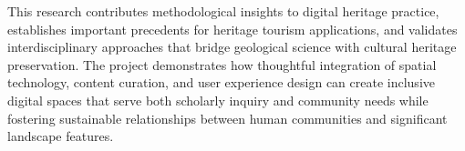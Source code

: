 \documentclass[
11pt, %
english, %
singlespacing, %
headsepline, %
]{MastersDoctoralThesis} %
\begin{document}
\begin{execSummary}
This research contributes methodological insights to digital heritage practice, establishes important precedents for heritage tourism applications, and validates interdisciplinary approaches that bridge geological science with cultural heritage preservation. The project demonstrates how thoughtful integration of spatial technology, content curation, and user experience design can create inclusive digital spaces that serve both scholarly inquiry and community needs while fostering sustainable relationships between human communities and significant landscape features.
\end{execSummary}


\tableofcontents %

\listoffigures %


\mainmatter %

\pagestyle{thesis} %





 


\appendix %


%


\printbibliography[heading=bibintoc]

\end{document}
